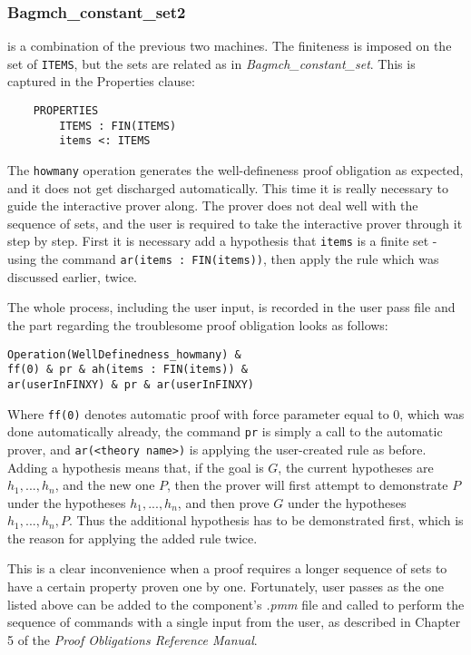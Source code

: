\documentclass[11pt,journal]{IEEEtran}
\begin{document}
	\subsubsection{Bagmch\_constant\_set2} is a combination of the previous two machines. The finiteness is imposed on the set of \texttt{ITEMS}, but the sets are related as in \emph{Bagmch\_constant\_set}. This is captured in the Properties clause:
	\begin{lstlisting}
	PROPERTIES
		ITEMS : FIN(ITEMS)
		items <: ITEMS 
	\end{lstlisting}
	The \texttt{howmany} operation generates the well-defineness proof obligation as expected, and it does not get discharged automatically. This time it is really necessary to guide the interactive prover along. The prover does not deal well with the sequence of sets, and the user is required to take the interactive prover through it step by step. First it is necessary add a hypothesis that \texttt{items} is a finite set - using the command \texttt{ar(items : FIN(items))}, then apply the rule which was discussed earlier, twice. 
	
	The whole process, including the user input, is recorded in the user pass file and the part regarding the troublesome proof obligation looks as follows:
	
	\begin{lstlisting}
Operation(WellDefinedness_howmany) & 
ff(0) & pr & ah(items : FIN(items)) &
ar(userInFINXY) & pr & ar(userInFINXY)
	\end{lstlisting}
	Where \texttt{ff(0)} denotes automatic proof with force parameter equal to 0, which was done automatically already, the command \texttt{pr} is simply a call to the automatic prover, and \texttt{ar(<theory name>)} is applying the user-created rule as before. Adding a hypothesis means that, if the goal is $G$, the current hypotheses are $h_1, ..., h_n$, and the new one $P$, then the prover will first attempt to demonstrate $P$ under the hypotheses $h_1, ..., h_n$, and then prove $G$ under the hypotheses $h_1, ...,h_n, P$.\cite{PO reference}  Thus the additional hypothesis has to be demonstrated first, which is the reason for applying the added rule twice. 
	
	This is a clear inconvenience when a proof requires a longer sequence of sets to have a certain property proven one by one. Fortunately, user passes as the one listed above can be added to the component's \emph{.pmm} file and called to perform the sequence of commands with a single input from the user, as described in Chapter 5 of the \emph{Proof Obligations Reference Manual}.
	
\end{document}

